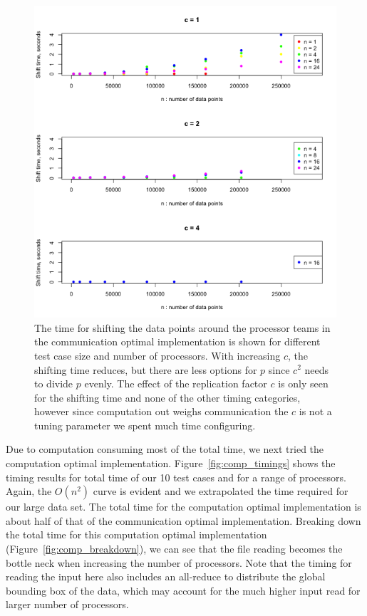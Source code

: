 \begin{figure}[!h]
   \centering
   \includegraphics[width=\textwidth]{./fig/comm_allc_comm.png} %
   \caption{The time for shifting the data points around the processor teams in the communication optimal implementation is shown for different test case size and number of processors. With increasing $c$, the shifting time reduces, but there are less options for $p$ since $c^2$ needs to divide $p$ evenly. The effect of the replication factor $c$ is only seen for the shifting time and none of the other timing categories, however since computation out weighs communication the $c$ is not a tuning parameter we spent much time configuring.}
   \label{fig:comm_allc_comm}
\end{figure}

Due to computation consuming most of the total time, we next tried the computation optimal implementation. Figure~\ref{fig:comp_timings} shows the timing results for total time of our 10 test cases and for a range of processors. Again, the $O(n^2)$ curve is evident and we extrapolated the time required for our large data set. The total time for the computation optimal implementation is about half of that of the communication optimal implementation. Breaking down the total time for this computation optimal implementation (Figure~\ref{fig:comp_breakdown}), we can see that the file reading becomes the bottle neck  when increasing the number of processors. Note that the timing for reading the input here also includes an all-reduce to distribute the global bounding box of the data, which may account for the much higher input read for larger number of processors.

